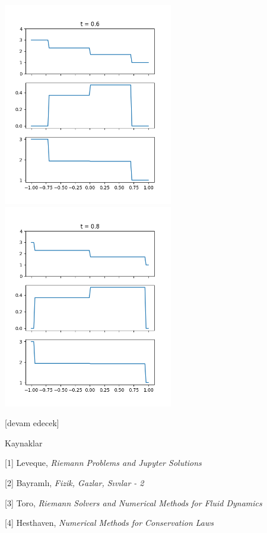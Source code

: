 \documentclass[12pt,fleqn]{article}\usepackage{../../common}
\begin{document}
\includegraphics[width=20em]{euler-roe-60.png}
\includegraphics[width=20em]{euler-roe-80.png}


[devam edecek]


Kaynaklar

[1] Leveque, {\em Riemann Problems and Jupyter Solutions}

[2] Bayramlı, {\em Fizik, Gazlar, Sıvılar - 2}

[3] Toro, {\em Riemann Solvers and Numerical Methods for Fluid Dynamics}

[4] Hesthaven, {\em Numerical Methods for Conservation Laws}
\end{document}

